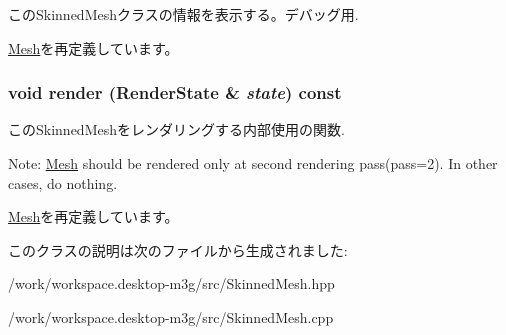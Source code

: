 このSkinnedMeshクラスの情報を表示する。デバッグ用. 

\hyperlink{classm3g_1_1Mesh_6fea17fa1532df3794f8cb39cb4f911f}{Mesh}を再定義しています。\hypertarget{classm3g_1_1SkinnedMesh_8babc8a79b78615da51161e94029eea9}{
\subsubsection[{render}]{\setlength{\rightskip}{0pt plus 5cm}void render ({\bf RenderState} \& {\em state}) const}}
\label{classm3g_1_1SkinnedMesh_8babc8a79b78615da51161e94029eea9}


このSkinnedMeshをレンダリングする内部使用の関数.

Note: \hyperlink{classm3g_1_1Mesh}{Mesh} should be rendered only at second rendering pass(pass=2). In other cases, do nothing. 

\hyperlink{classm3g_1_1Mesh_8babc8a79b78615da51161e94029eea9}{Mesh}を再定義しています。

このクラスの説明は次のファイルから生成されました:\begin{CompactItemize}
\item 
/work/workspace.desktop-m3g/src/SkinnedMesh.hpp\item 
/work/workspace.desktop-m3g/src/SkinnedMesh.cpp\end{CompactItemize}
